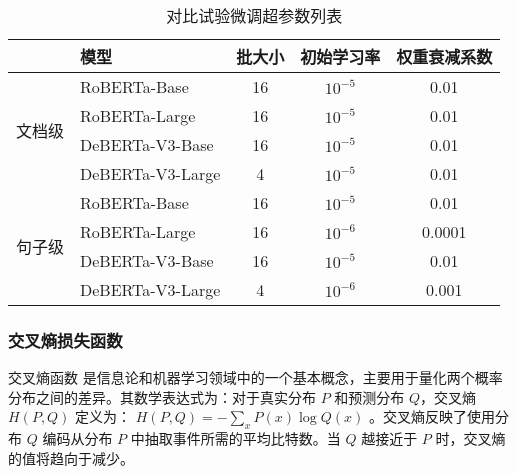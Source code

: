 \begin{table*}[htbp]
\centering
\caption{对比试验微调超参数列表}
\label{tab:hyper-parameters}
\begin{tabular}{c|l|ccc}
\toprule
                          & \textbf{模型}   & \textbf{批大小} & \textbf{初始学习率} & \textbf{权重衰减系数} \\ \midrule
\multirow{4}{*}{文档级}    & RoBERTa-Base \cite{liu_roberta_2019}     & 16                  & $10^{-5}$                & 0.01                  \\
                          & RoBERTa-Large \cite{liu_roberta_2019}    & 16                  & $10^{-5}$                & 0.01                  \\
                          & DeBERTa-V3-Base \cite{he2023debertav3improvingdebertausing}  & 16                  & $10^{-5}$                & 0.01                  \\
                          & DeBERTa-V3-Large \cite{he2023debertav3improvingdebertausing} & 4                   & $10^{-5}$                & 0.01                  \\ \midrule
\multirow{4}{*}{句子级}    & RoBERTa-Base \cite{liu_roberta_2019}     & 16                  & $10^{-5}$                & 0.01                  \\
                          & RoBERTa-Large \cite{liu_roberta_2019}    & 16                  & $10^{-6}$               & 0.0001                \\
                          & DeBERTa-V3-Base \cite{he2023debertav3improvingdebertausing}  & 16                  & $10^{-5}$                & 0.01                  \\
                          & DeBERTa-V3-Large \cite{he2023debertav3improvingdebertausing} & 4                   & $10^{-6}$               & 0.001                 \\ \bottomrule
\end{tabular}
\end{table*}

\subsubsection{交叉熵损失函数}

交叉熵函数 \cite{CrossEntropy} 是信息论和机器学习领域中的一个基本概念，主要用于量化两个概率分布之间的差异。其数学表达式为：对于真实分布 \( P \) 和预测分布 \( Q \)，交叉熵 \( H(P, Q) \) 定义为：
\(
H(P, Q) = -\sum_x P(x) \log Q(x)
\)
。交叉熵反映了使用分布 \( Q \) 编码从分布 \( P \) 中抽取事件所需的平均比特数。当 \( Q \) 越接近于 \( P \) 时，交叉熵的值将趋向于减少。

